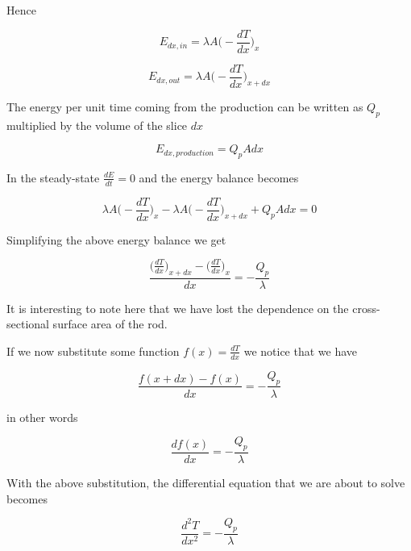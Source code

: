 \documentclass[10pt]{article}
\begin{document}
Hence

\begin{equation}
E_{dx, in} = \lambda A \Big(- \frac{dT}{dx} \Big)_x
\end{equation}

\begin{equation}
E_{dx, out} = \lambda A \Big(- \frac{dT}{dx} \Big)_{x + dx}
\end{equation}

\newpage

The energy per unit time coming from the production can be written as $Q_p$ multiplied by the volume of the slice $dx$

\begin{equation}
E_{dx, production} = Q_p A dx
\end{equation}

In the steady-state $\frac{dE}{dt} = 0$ and the energy balance becomes

\begin{equation}
\lambda A \Big(- \frac{dT}{dx} \Big)_x - \lambda A \Big(- \frac{dT}{dx} \Big)_{x + dx} + Q_p A dx = 0
\end{equation}

Simplifying the above energy balance we get

\begin{equation*}
\frac{\Big(\frac{dT}{dx} \Big)_{x + dx} - \Big(\frac{dT}{dx} \Big)_x  }{dx} = - \frac{Q_p}{\lambda}
\end{equation*}

It is interesting to note here that we have lost the dependence on the cross-sectional surface area of the rod.

If we now substitute some function $f(x) = \frac{dT}{dx}$ we notice that we have

\begin{equation*}
\frac{f(x + dx) - f(x)}{dx} = - \frac{Q_p}{\lambda}
\end{equation*}

in other words

\begin{equation}
\frac{df(x)}{dx} = - \frac{Q_p}{\lambda}
\end{equation}

With the above substitution, the differential equation that we are about to solve becomes

\begin{equation}
\frac{d^2T}{dx^2} = - \frac{Q_p}{\lambda}
\end{equation}
\end{document}
